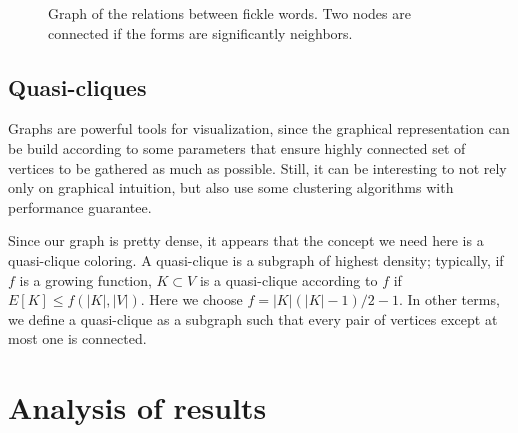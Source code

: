 \documentclass[runningheads,a4paper]{llncs}
\begin{document}
\begin{figure}[h!]
\label{fig:graph1}
\caption{Graph of the relations between fickle words. Two nodes are connected if the forms are significantly neighbors.}
\end{figure}

\subsection{Quasi-cliques}

Graphs are powerful tools for visualization, since the graphical representation can be build according to some parameters that ensure highly connected set of vertices to be gathered as much as possible. Still, it can be interesting to not rely only on graphical intuition, but also use some clustering algorithms with performance guarantee.

Since our graph is pretty dense, it appears that the concept we need here is a quasi-clique coloring. A quasi-clique is a subgraph of highest density; typically, if $f$ is a growing function, $K \subset V$ is a quasi-clique according to $f$ if $E[K] \leq f(|K|,|V|)$. Here we choose $f=|K|(|K|-1)/2-1$. In other terms, we define a quasi-clique as a subgraph such that every pair of vertices except at most one is connected.



\section{Analysis of results}
\end{document}

